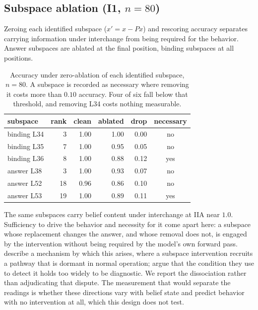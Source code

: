 \documentclass{article}
\begin{document}
\subsection{Subspace ablation (I1, $n = 80$)}
\label{sec:ablation}

Zeroing each identified subspace ($x' = x - Px$) and rescoring accuracy separates carrying
information under interchange from being required for the behavior. Answer subspaces are
ablated at the final position, binding subspaces at all positions.

\begin{table}[h]
\centering
\small
\begin{tabular}{lrrrrc}
\toprule
subspace & rank & clean & ablated & drop & necessary \\
\midrule
binding L34 & 3 & 1.00 & 1.00 & 0.00 & no \\
binding L35 & 7 & 1.00 & 0.95 & 0.05 & no \\
binding L36 & 8 & 1.00 & 0.88 & 0.12 & yes \\
answer L38 & 3 & 1.00 & 0.93 & 0.07 & no \\
answer L52 & 18 & 0.96 & 0.86 & 0.10 & no \\
answer L53 & 19 & 1.00 & 0.89 & 0.11 & yes \\
\bottomrule
\end{tabular}
\caption{Accuracy under zero-ablation of each identified subspace, $n = 80$. A subspace is
recorded as necessary where removing it costs more than $0.10$ accuracy. Four of six fall
below that threshold, and removing L34 costs nothing measurable.}
\label{tab:ablation}
\end{table}

The same subspaces carry belief content under interchange at IIA near $1.0$. Sufficiency to
drive the behavior and necessity for it come apart here: a subspace whose replacement changes
the answer, and whose removal does not, is engaged by the intervention without being required
by the model's own forward pass. \citet{makelov2024illusion} describe a mechanism by which
this arises, where a subspace intervention recruits a pathway that is dormant in normal
operation; \citet{wu2024replyillusion} argue that the condition they use to detect it holds
too widely to be diagnostic. We report the dissociation rather than adjudicating that
dispute. The measurement that would separate the readings is whether these directions vary
with belief state and predict behavior with no intervention at all, which this design does
not test.
\end{document}
